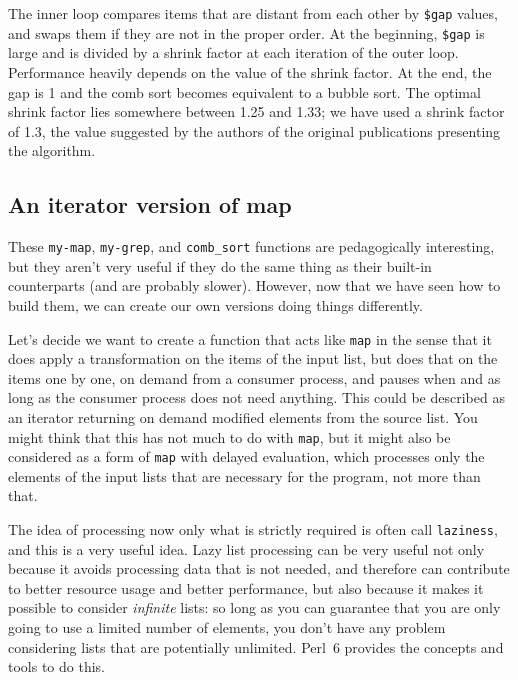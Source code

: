 The inner loop compares items that are distant from each 
other by \verb'$gap' values, and swaps them if they are 
not in the proper order. At the beginning, \verb'$gap' 
is large and is divided by a shrink factor at each 
iteration of the outer loop. Performance heavily depends
on the value of the shrink factor. At the end, the gap 
is 1 and the comb sort becomes equivalent to a bubble 
sort. The optimal shrink factor lies somewhere between 1.25 
and 1.33; we have used a shrink factor of 1.3, the value 
suggested by the authors of the original publications 
presenting the algorithm.

\subsection{An iterator version of map}

These {\tt my-map}, {\tt my-grep}, and {\tt comb\_sort} 
functions are pedagogically interesting, but they aren't 
very useful if they do the same thing as their built-in 
counterparts (and are probably slower). However, now 
that we have seen how to build them, we can create our 
own versions doing things differently.

Let's decide we want to create a function that acts like 
{\tt map} in the sense that it does apply a 
transformation on the items of the input list, but does 
that on the items one by one, on demand from a consumer 
process, and pauses when and as long as the consumer process 
does not need anything. This could be described as an 
iterator returning on demand modified elements from the 
source list. You might think that this has not much to 
do with {\tt map}, but it might also be considered as 
a form of {\tt map} with delayed evaluation, which 
processes only the elements of the input lists that are 
necessary for the program, not more than that. 

The idea 
of processing now only what is strictly required is often call 
{\tt laziness}, and this is a very useful idea. Lazy 
list processing can be very useful not only because it 
avoids processing data that is not needed, and therefore 
can contribute to better resource usage and better 
performance, but also because it makes it possible to consider 
\emph{infinite} lists: so long as you can guarantee that 
you are only going to use a limited number of elements, 
you don't have any problem considering lists that are 
potentially unlimited. Perl~6 provides the concepts and 
tools to do this.

